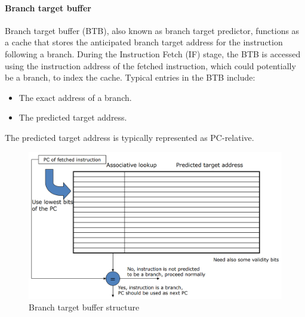 \paragraph*{Branch target buffer}
Branch target buffer (BTB), also known as branch target predictor, functions as a cache that stores the anticipated branch target address for the instruction following a branch.
During the Instruction Fetch (IF) stage, the BTB is accessed using the instruction address of the fetched instruction, which could potentially be a branch, to index the cache.
Typical entries in the BTB include:
\begin{itemize}
    \item The exact address of a branch.
    \item The predicted target address.
\end{itemize}
The predicted target address is typically represented as PC-relative.
\begin{figure}[H]
    \centering
    \includegraphics[width=0.5\linewidth]{images/btb.png}
    \caption{Branch target buffer structure}
\end{figure}
